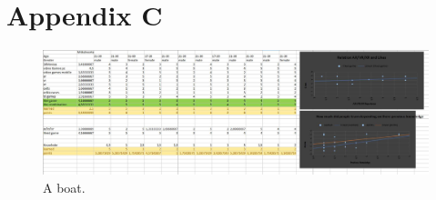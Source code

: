 \clearpage
\pagebreak
\section{Appendix C}

\begin{figure}[ht]
	\includegraphics[width=\linewidth]{pictures/userstudy_data}
	\caption{A boat.}
	\label{fig:boat1}
\end{figure}

